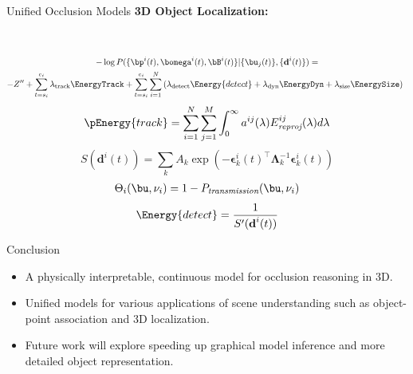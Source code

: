 \documentclass[handout,final]{beamer}
\newcommand{\Ptransmission}{P_{\textit{transmission}}}%
\newcommand{\bepsilon}{{\bm{\epsilon}}}
\newcommand{\meandepth}[1]{\nu_#1}
\newcommand{\bLambda}{\bm{\Lambda}}
\newlength{\onecolwid}
\begin{document}
\begin{frame}[t]
\begin{columns}[t]
\begin{column}{\onecolwid}
\begin{block}{Unified Occlusion Models}
	  \textbf{3D Object Localization:}
		\begin{figure}
			\newcommand{\imagewidth}{18cm}
		     \\
		            
        \end{figure}	
        \begin{multline*}
          -\log{P(\{ \bp^i(t) , \bomega^i(t) , \bB^i(t) \} | \{\bu_j(t)\} , \{\textbf{d}^i(t)\} )} = \\
          -Z'' 
          + \sum_{t=s_i}^{e_i} \lambda_{\text{track}}\EnergyTrack
          +  
          \sum_{t=s_i}^{e_i} \sum_{i=1}^N  
          \left(
            \lambda_{\text{detect}}\Energy{detect}
            + \lambda_{\text{dyn}}\EnergyDyn    
            + \lambda_{\text{size}}\EnergySize
          \right)
          \enspace
        \end{multline*}        
        \begin{align}
		  \pEnergy{track} = \sum_{i=1}^{N} \sum_{j = 1}^{M} \int_0^\infty a^{ij}(\lambda) E^{ij}_{\textit{reproj}}(\lambda) d\lambda
		\end{align}        
        \begin{equation}
			S(\textbf{d}^i(t)) = \sum_k A_k \exp \left( -\bepsilon_k^{i}(t)^\top \bLambda_k^{-1} \bepsilon_k^{i}(t) \right)
		\end{equation}		
		\begin{align}
		  \Theta_{i}(\bu, \meandepth{i}) = 1 - \Ptransmission(\bu, \meandepth{i})
		\end{align}		
		\begin{align}
		  \Energy{detect} = \frac{1}{S'(\textbf{d}^i(t))}
		\end{align}
        
                

      \end{block}
      \begin{block}{Conclusion}
        \begin{itemize}
          \item A physically interpretable, continuous model for occlusion reasoning in 3D.
          \item Unified models for various applications of scene understanding such as object-point association and 3D localization.
          \item Future work will explore speeding up graphical model inference and more detailed object representation.
        \end{itemize}
      \end{block}


\end{column}
\end{columns}
\end{frame}
\end{document}

